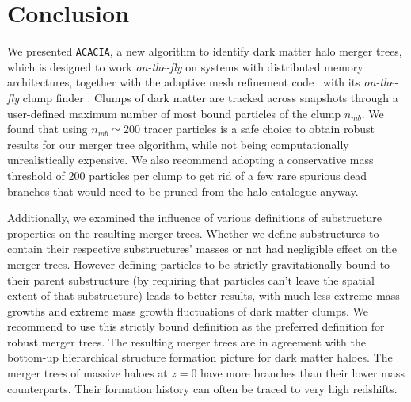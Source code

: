 \section{Conclusion}\label{chap:conclusion}


We presented \texttt{ACACIA}, a new  algorithm to identify dark matter
halo  merger trees,  which is  designed  to work  {\it on-the-fly}  on
systems  with  distributed  memory architectures,  together  with  the
adaptive mesh refinement code \ramses\ with its {\it on-the-fly} clump
finder  \phew.  Clumps  of dark  matter are  tracked across  snapshots
through a user-defined  maximum number of most bound  particles of the
clump  $n_{mb}$.   We found  that  using  $n_{mb} \simeq  200$  tracer
particles is  a safe choice  to obtain  robust results for  our merger
tree  algorithm,  while   not  being  computationally  unrealistically
expensive.  We  also recommend adopting a  conservative mass threshold
of 200  particles per  clump to get  rid of a  few rare  spurious dead
branches that would need to be pruned from the halo catalogue anyway.

Additionally,  we examined  the  influence of  various definitions  of
substructure  properties on  the  resulting merger  trees. Whether  we
define substructures to contain their respective substructures' masses
or not  had negligible effect  on the merger trees.   However defining
particles  to  be  strictly  gravitationally  bound  to  their  parent
substructure  (by requiring  that  particles can't  leave the  spatial
extent of that  substructure) leads to better results,  with much less
extreme  mass growths  and extreme  mass growth  fluctuations of  dark
matter clumps.  We recommend to  use this strictly bound definition as
the  preferred  definition for  robust  merger  trees.  The  resulting
merger  trees  are  in   agreement  with  the  bottom-up  hierarchical
structure formation picture  for dark matter haloes.  The merger trees
of massive  haloes at $z=0$ have  more branches than their  lower mass
counterparts.  Their  formation history  can often  be traced  to very
high redshifts.

